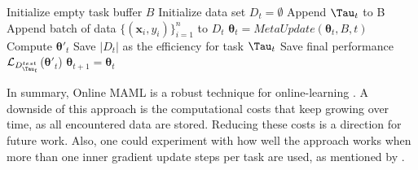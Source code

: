 \begin{algorithm}
\caption{FTML by }\label{alg:ftml}
\begin{algorithmic}[1]
\State Initialize empty task buffer $B$
    \State Initialize data set $D_{t} = \emptyset$
    \State Append $\Tau_{t}$ to B
        \State Append batch of data $\{(\boldsymbol{x}_{i}, y_{i})\}_{i=1}^{n}$ to $D_{t}$
        \State $\boldsymbol{\theta}_{t} = \mathit{MetaUpdate}(\boldsymbol{\theta}_{t}, B, t)$
        \State Compute $\boldsymbol{\theta}'_{t}$
            \State Save $|D_{t}|$ as the efficiency for task $\Tau_{t}$
        \EndIf
    \EndWhile
    \State Save final performance $\mathcal{L}_{D^{test}_{\Tau_{t}}}$($\boldsymbol{\theta}'_{t}$)
    \State $\boldsymbol{\theta}_{t+1} = \boldsymbol{\theta}_{t}$
\EndFor
\end{algorithmic}
\end{algorithm}
In summary, Online MAML is a robust technique for online-learning . A downside of this approach is the computational costs that keep growing over time, as all encountered data are stored. Reducing these costs is a direction for future work. Also, one could experiment with how well the approach works when more than one inner gradient update steps per task are used, as mentioned by .


